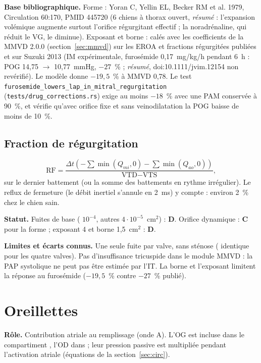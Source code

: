 \documentclass[10pt,a4paper]{article}
\newcommand{\cmd}[1]{\texttt{#1}}
\newcommand{\vp}[1]{\text{\texttt{\detokenize{#1}}}}
\newcommand{\evC}{\textcolor{orange!80!black}{\textbf{C}}}
\newcommand{\evD}{\textcolor{red!70!black}{\textbf{D}}}
\newcommand{\acc}[1]{\textsl{#1}}
\newcommand{\limite}[1]{\par\textbf{Limites et écarts connus.} #1}
\newcommand{\sources}[1]{\par\textbf{Base bibliographique.} #1}
\begin{document}
\sources{Forme : Yoran C, Yellin EL, Becker RM et al. 1979, Circulation 60:170, PMID 445720 (6 chiens à thorax ouvert, \acc{résumé} : l'expansion volémique augmente surtout l'orifice régurgitant effectif ; la noradrénaline, qui réduit le VG, le diminue). Exposant et borne : calés avec les coefficients de la MMVD 2.0.0 (section~\ref{sec:mmvd}) sur les EROA et fractions régurgitées publiées et sur Suzuki 2013 (IM expérimentale, furosémide 0,17~mg/kg/h pendant 6~h : POG 14,75 $\to$ 10,77~mmHg, $-27$~\% ; \acc{résumé}, doi:10.1111/jvim.12154 non revérifié). Le modèle donne $-19{,}5$~\% à MMVD 0,78. Le test \cmd{furosemide\_lowers\_lap\_in\_mitral\_regurgitation} (\cmd{tests/drug\_corrections.rs}) exige au moins $-18$~\% avec une PAM conservée à 90~\%, et vérifie qu'avec orifice fixe et sans veinodilatation la POG baisse de moins de 10~\%.}

\subsection{Fraction de régurgitation}
\begin{equation}
\text{RF} = \frac{\Delta t\left(-\sum \min(Q_{mi}, 0) - \sum \min(Q_{ao}, 0)\right)}{\text{VTD} - \text{VTS}},
\end{equation}
sur le dernier battement (ou la somme des battements en rythme irrégulier). Le reflux de fermeture (le débit inertiel s'annule en 2~ms) y compte : environ 2~\% chez le chien sain.

\textbf{Statut.} Fuites de base (\vp{a_mr} $10^{-4}$, autres $4\cdot 10^{-5}$~cm$^2$) : \evD{}. Orifice dynamique : \evC{} pour la forme ; exposant 4 et borne 1,5~cm$^2$ : \evD{}.

\limite{Une seule fuite par valve, sans sténose (\vp{r_valve} identique pour les quatre valves). Pas d'insuffisance tricuspide dans le module MMVD : la PAP systolique ne peut pas être estimée par l'IT. La borne et l'exposant limitent la réponse au furosémide ($-19{,}5$~\% contre $-27$~\% publié).}

\section{Oreillettes}\label{sec:oreillettes}

\textbf{Rôle.} Contribution atriale au remplissage (onde A). L'OG est incluse dans le compartiment \vp{pv}, l'OD dans \vp{sv} ; leur pression passive est multipliée pendant l'activation atriale (équations de la section~\ref{sec:circ}).
\end{document}
